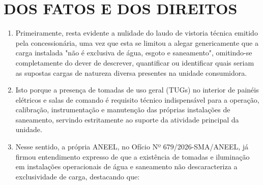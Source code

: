 \newcommand{\tipoRequerimento}{cobrança indevida sobre enquadramento tarifário incorreto}
\newcommand{\tese}{}

\section{DOS FATOS E DOS DIREITOS}

\begin{enumerate}[resume]
    \item Primeiramente, resta evidente a nulidade do laudo de vistoria técnica emitido pela concessionária, uma vez que esta se limitou a alegar genericamente que a carga instalada "não é exclusiva de água, esgoto e saneamento", omitindo-se completamente do dever de descrever, quantificar ou identificar quais seriam as supostas cargas de natureza diversa presentes na unidade consumidora.


    \item Isto porque a presença de tomadas de uso geral (TUGs) no interior de painéis elétricos e salas de comando é requisito técnico indispensável para a operação, calibração, instrumentação e manutenção das próprias instalações de saneamento, servindo estritamente ao suporte da atividade principal da unidade.  

    \item Nesse sentido, a própria ANEEL, no Ofício Nº 679/2026-SMA/ANEEL, já firmou entendimento expresso de que a existência de tomadas e iluminação em instalações operacionais de água e saneamento não descaracteriza a exclusividade de carga, destacando que:  
    
     


\end{enumerate}
